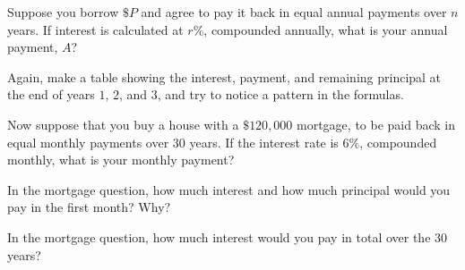\documentclass[,nooutcomes]{ximera}
\begin{document}
\begin{question}
Suppose you borrow $\$P$ and agree to pay it back in equal annual
payments over $n$ years.  If interest is calculated at $r\%$,
compounded annually, what is your annual payment, $A$?
\begin{hint}
Again, make a table showing the interest, payment, and remaining
principal at the end of years $1$, $2$, and $3$, and try to notice a
pattern in the formulas.
\end{hint} 
\begin{freeResponse}
\end{freeResponse}
\end{question}

\begin{question}
Now suppose that you buy a house with a $\$120,000$ mortgage, to be
paid back in equal monthly payments over $30$ years.  If the interest
rate is $6\%$, compounded monthly, what is your monthly payment?
\begin{freeResponse}
\end{freeResponse}
\end{question}

\begin{question}
In the mortgage question, how much interest and how much principal
would you pay in the first month? Why?
\begin{freeResponse}
\end{freeResponse}
\end{question}

\begin{question}
In the mortgage question, how much interest would you pay in total
over the $30$ years?
\begin{freeResponse}
\end{freeResponse}
\end{question}
\end{document}
